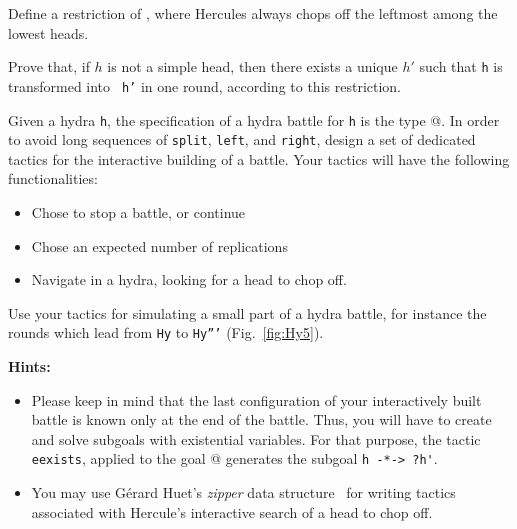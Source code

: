 
\begin{exercise}
Define a restriction of ,  where Hercules always chops off
the leftmost among the lowest heads.

Prove that, if $h$ is not a simple head, then there exists a unique $h'$ such that \texttt{h}  is transformed into \texttt{ h'} in one round, according to this restriction.


\end{exercise}


\begin{exercise}
\label{exo:interactive-battle}
Given a hydra \texttt{h}, the specification of a hydra battle for \texttt{h} is the type 
@. In order to avoid long sequences of \texttt{split}, \texttt{left}, and 
\texttt{right}, design a set of dedicated tactics for the interactive building of a battle.
Your tactics will have the following functionalities:
\begin{itemize}
\item  Chose to stop a battle, or continue
\item Chose an expected number of replications
\item Navigate in a hydra, looking for a head to chop off.
\end{itemize}

Use your tactics for simulating a small part of a hydra battle, for instance the rounds which lead from
\texttt{Hy} to \texttt{Hy'''}  (Fig.~\vref{fig:Hy5}).

\textbf{Hints:} 
\begin{itemize}

\item Please keep in mind that the last  configuration of your interactively built battle is known only at the end of the battle. Thus, you will have to create and solve subgoals with existential variables. For that purpose, the tactic \texttt{eexists}, applied to the 
goal @ generates the subgoal \Verb|h -*-> ?h'|.
\item You may use Gérard Huet's \emph{zipper} data structure~\cite{zipper} for writing tactics associated with Hercule's  interactive search of a head to chop off.
\end{itemize}






\end{exercise}




